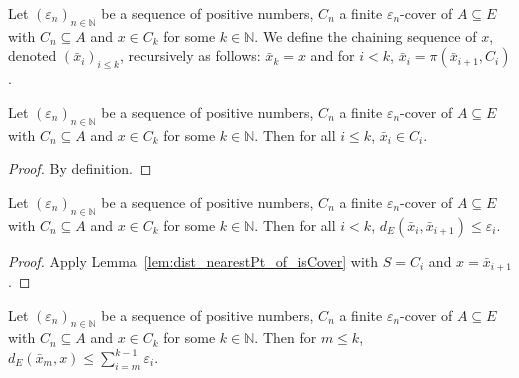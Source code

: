 \begin{definition}\label{def:chainingSequence}
  \leanok
Let $(\varepsilon_n)_{n \in \mathbb{N}}$ be a sequence of positive numbers, $C_n$ a finite $\varepsilon_n$-cover of $A \subseteq E$ with $C_n \subseteq A$ and $x \in C_k$ for some $k \in \mathbb{N}$.
We define the chaining sequence of $x$, denoted $(\bar{x}_i)_{i \le k}$, recursively as follows: $\bar{x}_k = x$ and for $i < k$, $\bar{x}_i = \pi(\bar{x}_{i+1}, C_i)$.
\end{definition}


\begin{lemma}\label{lem:chainingSequence_mem}
  \leanok
Let $(\varepsilon_n)_{n \in \mathbb{N}}$ be a sequence of positive numbers, $C_n$ a finite $\varepsilon_n$-cover of $A \subseteq E$ with $C_n \subseteq A$ and $x \in C_k$ for some $k \in \mathbb{N}$.
Then for all $i \le k$, $\bar{x}_i\in C_i$.
\end{lemma}

\begin{proof}\leanok
By definition.
\end{proof}


\begin{lemma}\label{lem:dist_chainingSequence_add_one}
  \leanok
Let $(\varepsilon_n)_{n \in \mathbb{N}}$ be a sequence of positive numbers, $C_n$ a finite $\varepsilon_n$-cover of $A \subseteq E$ with $C_n \subseteq A$ and $x \in C_k$ for some $k \in \mathbb{N}$.
Then for all $i < k$, $d_E(\bar{x}_i, \bar{x}_{i+1}) \le \varepsilon_i$.
\end{lemma}

\begin{proof}\leanok
Apply Lemma~\ref{lem:dist_nearestPt_of_isCover} with $S = C_i$ and $x = \bar{x}_{i+1}$.
\end{proof}


\begin{lemma}\label{lem:dist_chainingSequence_le_sum}
  \leanok
Let $(\varepsilon_n)_{n \in \mathbb{N}}$ be a sequence of positive numbers, $C_n$ a finite $\varepsilon_n$-cover of $A \subseteq E$ with $C_n \subseteq A$ and $x \in C_k$ for some $k \in \mathbb{N}$.
Then for $m \le k$, $d_E(\bar{x}_m, x) \le \sum_{i=m}^{k-1} \varepsilon_i$.
\end{lemma}

